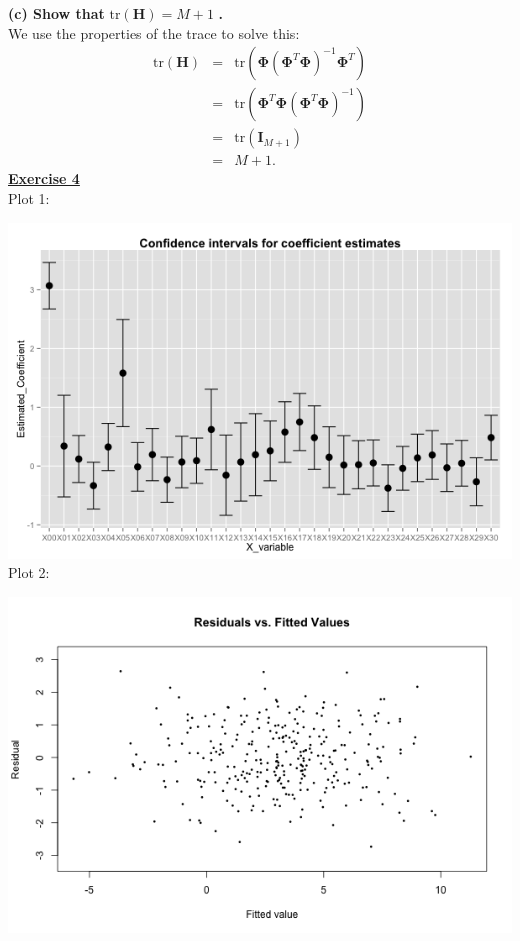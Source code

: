 \documentclass[a4paper, 11pt]{article}
\begin{document}
\textbf{(c) Show that} $\text{tr}(\mathbf{H}) = M+1$ \textbf{.}\\
\newline We use the properties of the trace to solve this:
\begin{eqnarray}
\text{tr}(\mathbf{H}) &=& \text{tr} \left( \mathbf{\Phi} \left( \mathbf{\Phi}^T \mathbf{\Phi} \right)^{-1} \mathbf{\Phi}^T \right) \nonumber \\
&=& \text{tr} \left( \mathbf{\Phi}^T \mathbf{\Phi} \left( \mathbf{\Phi}^T \mathbf{\Phi} \right)^{-1} \right) \nonumber \\
&=& \text{tr} \left(\mathbf{I}_{M+1} \right) \nonumber \\
&=& M+1. \nonumber
\end{eqnarray}
\newpage
\textbf{\underline{Exercise 4}}\\
\newline Plot 1:\\
\begin{center}
\end{center}
\includegraphics[scale=0.7]{ps1_plot1.png}
\newline Plot 2:\\
\begin{center}
\includegraphics[scale=0.7]{ps1_plot2.png}
\end{center}
\end{document}
